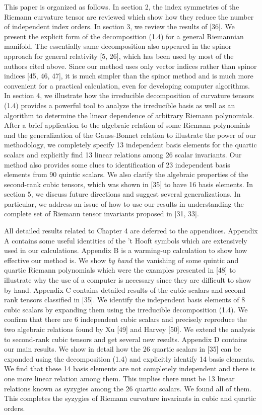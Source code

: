 \documentclass{article}
\begin{document}
This paper is organized as follows. In section 2, the index symmetries of the Riemann curvature tensor are reviewed which show how they reduce the number of independent index orders. In section 3, we review the results of [36]. We present the explicit form of the decomposition (1.4) for a general Riemannian manifold. The essentially same decomposition also appeared in the spinor approach for general relativity [5, 26], which has been used by most of the authors cited above. Since our method uses only vector indices rather than spinor indices [45, 46, 47], it is much simpler than the spinor method and is much more convenient for a practical calculation, even for developing computer algorithms. In section 4, we illustrate how the irreducible decomposition of curvature tensors (1.4) provides a powerful tool to analyze the irreducible basis as well as an algorithm to determine the linear dependence of arbitrary Riemann polynomials. After a brief application to the algebraic relation of some Riemann polynomials and the generalization of the Gauss-Bonnet relation to illustrate the power of our methodology, we completely specify 13 independent basis elements for the quartic scalars and explicitly find 13 linear relations among 26 scalar invariants. Our method also provides some clues to identification of 23 independent basis elements from 90 quintic scalars. We also clarify the algebraic properties of the second-rank cubic tensors, which was shown in [35] to have 16 basis elements. In section 5, we discuss future directions and suggest several generalizations. In particular, we address an issue of how to use our results in understanding the complete set of Riemann tensor invariants proposed in [31, 33].

All detailed results related to Chapter 4 are deferred to the appendices. Appendix A contains some useful identities of the 't Hooft symbols which are extensively used in our calculations. Appendix B is a warming-up calculation to show how effective our method is. We show \textit{by hand} the vanishing of some quintic and quartic Riemann polynomials which were the examples presented in [48] to illustrate why the use of a computer is necessary since they are difficult to show by hand. Appendix C contains detailed results of the cubic scalars and second-rank tensors classified in [35]. We identify the independent basis elements of 8 cubic scalars by expanding them using the irreducible decomposition (1.4). We confirm that there are 6 independent cubic scalars and precisely reproduce the two algebraic relations found by Xu [49] and Harvey [50]. We extend the analysis to second-rank cubic tensors and get several new results. Appendix D contains our main results. We show in detail how the 26 quartic scalars in [35] can be expanded using the decomposition (1.4) and explicitly identify 14 basis elements. We find that these 14 basis elements are not completely independent and there is one more linear relation among them. This implies there must be 13 linear relations known as syzygies among the 26 quartic scalars. We found all of them. This completes the syzygies of Riemann curvature invariants in cubic and quartic orders.
\end{document}
